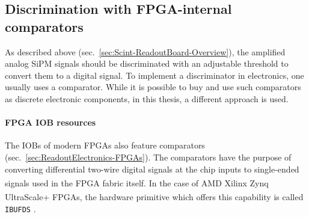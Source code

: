 \subsection{Discrimination with FPGA-internal comparators}
\label{sec:Scint-ReadoutBoard-FPGASampling}
As described above (sec.\ \ref{sec:Scint-ReadoutBoard-Overview}), the amplified analog \ac{SiPM} signals should be discriminated with an adjustable threshold to convert them to a digital signal. To implement a discriminator in electronics, one usually uses a comparator. While it is possible to buy and use such comparators as discrete electronic components, in this thesis, a different approach is used.
\paragraph{FPGA IOB resources}
The \acfp{IOB} of modern \acp{FPGA} also feature comparators (sec.\ \ref{sec:ReadoutElectronics-FPGAs}). The comparators have the purpose of converting differential two-wire digital signals at the chip inputs to single-ended signals used in the \ac{FPGA} fabric itself. In the case of AMD\textsuperscript{\texttrademark} Xilinx Zynq\textsuperscript{\texttrademark} UltraScale+\textsuperscript{\texttrademark} \acp{FPGA}, the hardware primitive which offers this capability is called \texttt{IBUFDS} \cite{UltraScale-FPGA-SelectIO-Resources}.
